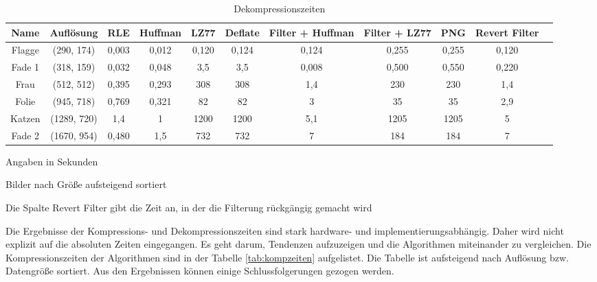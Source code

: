 \documentclass[conference]{IEEEtran}
\begin{document}
\begin{table}[ht]
  \renewcommand*{\arraystretch}{1.1}
  \centering
  \begin{threeparttable}
    \caption{Dekompressionszeiten}
    \begin{tabular}{c *9{c} S[table-format=5.9]}
      \toprule
      Name   & Auflösung   & RLE   & Huffman & LZ77  & Deflate & Filter + Huffman & Filter + LZ77 & PNG   & Revert Filter \\
      \midrule
      Flagge & (290, 174)  & 0,003 & 0,012   & 0,120 & 0,124   & 0,124            & 0,255         & 0,255 & 0,120         \\
      Fade 1 & (318, 159)  & 0,032 & 0,048   & 3,5   & 3,5     & 0,008            & 0,500         & 0,550 & 0,220         \\
      Frau   & (512, 512)  & 0,395 & 0,293   & 308   & 308     & 1,4              & 230           & 230   & 1,4           \\
      Folie  & (945, 718)  & 0,769 & 0,321   & 82    & 82      & 3                & 35            & 35    & 2,9           \\
      Katzen & (1289, 720) & 1,4   & 1       & 1200  & 1200    & 5,1              & 1205          & 1205  & 5             \\
      Fade 2 & (1670, 954) & 0,480 & 1,5     & 732   & 732     & 7                & 184           & 184   & 7
    \end{tabular}
    \par{} Angaben in Sekunden
    \par{} Bilder nach Größe aufsteigend sortiert
    \par{} Die Spalte Revert Filter gibt die Zeit an, in der die Filterung rückgängig gemacht wird
    \label{tab:dekompzeiten}
  \end{threeparttable}
\end{table}

Die Ergebnisse der Kompressions- und Dekompressionszeiten sind stark
hardware- und implementierungsabhängig.
Daher wird nicht explizit auf die absoluten Zeiten eingegangen.
Es geht darum, Tendenzen aufzuzeigen und die Algorithmen miteinander zu vergleichen.
Die Kompressionszeiten der Algorithmen sind in der
Tabelle \ref{tab:kompzeiten} aufgelistet.
Die Tabelle ist aufsteigend nach Auflösung bzw. Datengröße sortiert.
Aus den Ergebnissen können einige Schlussfolgerungen gezogen werden.
\end{document}
